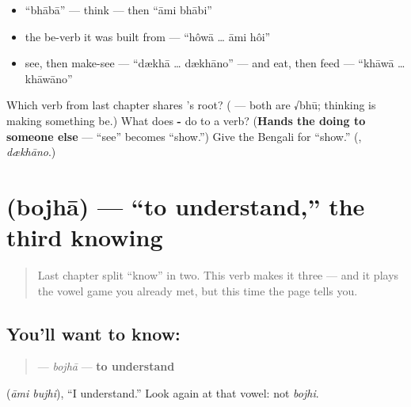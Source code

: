 \begin{itemize}
\raggedright
  \item \textquotedblleft{}bhābā\textquotedblright{} — think — then \textquotedblleft{}āmi bhābi\textquotedblright{}
  \item the be-verb it was built from — \textquotedblleft{}hôwā … āmi hôi\textquotedblright{}
  \item see, then make-see — \textquotedblleft{}dækhā … dækhāno\textquotedblright{} — and eat, then feed — \textquotedblleft{}khāwā … khāwāno\textquotedblright{}
\end{itemize}

\begin{tcolorbox}[breakable,colback=teal!4,colframe=teal!35!black,title={Before you move on}]
Which verb from last chapter shares 's root? (\textbf{} — both are √bhū; thinking is making something be.) What does \textbf{-} do to a verb? (\textbf{Hands the doing to someone else} —  \textquotedblleft{}see\textquotedblright{} becomes  \textquotedblleft{}show.\textquotedblright{}) Give the Bengali for \textquotedblleft{}show.\textquotedblright{} (\textbf{}, \emph{dækhāno}.)
\end{tcolorbox}
\section[bojhā]{ (bojhā) — \textquotedblleft{}to understand,\textquotedblright{} the third knowing}

\label{lesson:BN-C08-bojha}



\begin{quote}
Last chapter split \textquotedblleft{}know\textquotedblright{} in two. This verb makes it three — and it plays the vowel game you already met, but this time the page tells you.
\end{quote}

\subsection*{You'll want to know: }
\begin{quote}
\textbf{} — \emph{bojhā} — \textbf{to understand}
\end{quote}

  (\emph{āmi bujhi}), \textquotedblleft{}I understand.\textquotedblright{} Look again at that vowel: not \emph{bojhi}.


